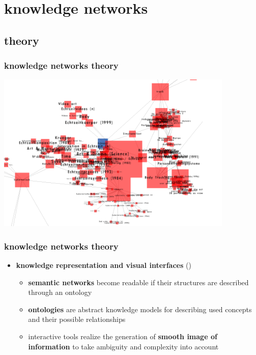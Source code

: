 \documentclass[blue]{beamer}
\begin{document}

\section{knowledge networks}
\subsection{theory}
\frame
{
\frametitle{\textbf{knowledge networks theory}}
\includegraphics[width=0.85\textwidth]{bin/semaspace/semaspace.png}
}

\frame
{
\frametitle{\textbf{knowledge networks theory}}
\begin{itemize}
	\item \textbf{knowledge representation and visual interfaces} ()
	\begin{itemize}
		\item \textbf{semantic networks} become readable if their structures are described through an ontology
		\item \textbf{ontologies} are abstract knowledge models for describing used concepts and their possible relationships
		\item interactive tools realize the generation of \textbf{smooth image of information} to take ambiguity and complexity into account
	\end{itemize}
\end{itemize}
}




\end{document}
